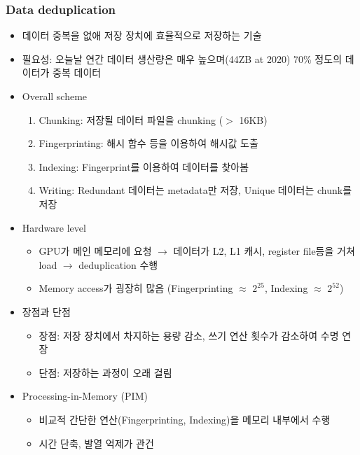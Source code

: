 \subsubsection*{Data deduplication}
\begin{itemize}
    \item 데이터 중복을 없애 저장 장치에 효율적으로 저장하는 기술
    \item 필요성: 오늘날 연간 데이터 생산량은 매우 높으며(44ZB at 2020) 70\% 정도의 데이터가 중복 데이터
    \item Overall scheme
    \begin{enumerate}
        \item Chunking: 저장될 데이터 파일을 chunking ($>$ 16KB)
        \item Fingerprinting: 해시 함수 등을 이용하여 해시값 도출
        \item Indexing: Fingerprint를 이용하여 데이터를 찾아봄
        \item Writing: Redundant 데이터는 metadata만 저장, Unique 데이터는 chunk를 저장
    \end{enumerate}
    \item Hardware level
    \begin{itemize}
        \item GPU가 메인 메모리에 요청 $\rightarrow$ 데이터가 L2, L1 캐시, register file등을 거쳐 load $\rightarrow$ deduplication 수행
        \item Memory access가 굉장히 많음 (Fingerprinting $\approx$ $2^{25}$, Indexing $\approx$ $2^{52}$)
    \end{itemize}
    \item 장점과 단점
    \begin{itemize}
        \item 장점: 저장 장치에서 차지하는 용량 감소, 쓰기 연산 횟수가 감소하여 수명 연장
        \item 단점: 저장하는 과정이 오래 걸림
    \end{itemize}
    \item Processing-in-Memory (PIM)
    \begin{itemize}
        \item 비교적 간단한 연산(Fingerprinting, Indexing)을 메모리 내부에서 수행
        \item 시간 단축, 발열 억제가 관건
    \end{itemize}
\end{itemize}

